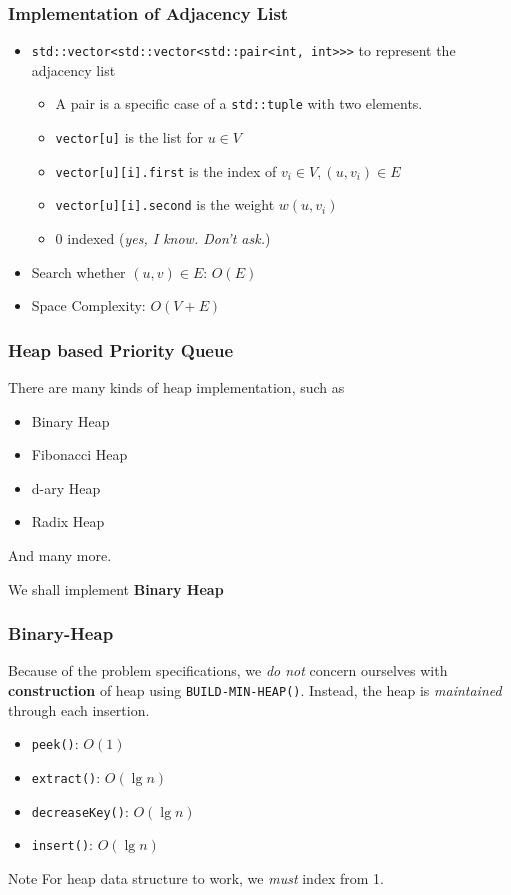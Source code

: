 \documentclass{beamer}
\begin{document}
\begin{frame}
	\frametitle{Implementation of Adjacency List}
	\begin{itemize}
		\item \texttt{std::vector<std::vector<std::pair<int, int>>>} to represent the adjacency list
		\begin{itemize}
			\item A pair is a specific case of a \texttt{std::tuple} with two elements.
			\item \texttt{vector[u]} is the list for \( u \in V \) 
			\item \texttt{vector[u][i].first} is the index of \( v_i \in V, (u, v_i) \in E \) 
			\item \texttt{vector[u][i].second} is the weight \( w(u, v_i) \) 	
			\item 0 indexed (\emph{yes, I know. Don't ask.})
		\end{itemize}
		\item Search whether \( (u, v) \in E \): \( O(E) \)  
		\item Space Complexity: \( O(V+E) \) 
	\end{itemize}
\end{frame}

\begin{frame}
	\frametitle{Heap based Priority Queue}
	There are many kinds of heap implementation, such as
	\begin{itemize}
		\item Binary Heap
		\item Fibonacci Heap
		\item d-ary Heap
		\item Radix Heap
	\end{itemize}
	And many more. \newline

	We shall implement \textbf{Binary Heap} 
\end{frame}

\begin{frame}
	\frametitle{Binary-Heap}
	Because of the problem specifications, we \emph{do not} concern ourselves with \textbf{construction} of heap using \texttt{BUILD-MIN-HEAP()}. Instead, the heap is \emph{maintained} through each insertion.
	\begin{itemize}
		\item \texttt{peek()}: \( O(1) \) 
		\item \texttt{extract()}: \( O(\lg{n}) \) 
		\item \texttt{decreaseKey()}: \( O(\lg{n}) \) 
		\item \texttt{insert()}: \( O(\lg{n}) \) 
		
	\end{itemize}

	\begin{block}{Note}
		For heap data structure to work, we \emph{must} index from 1.	
	\end{block}
\end{frame}
\end{document}
